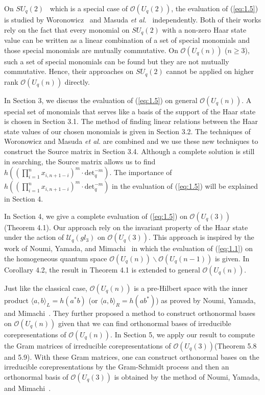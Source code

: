\documentclass[table,a4paper,reqno]{amsart}
\numberwithin{equation}{section}
\theoremstyle{definition}
\begin{document}
On $SU_q(2)$~\cite{sl1987twisted} which is a special case of $\mathcal{O}(U_q(2))$, the evaluation of (\ref{eq:1.5}) is studied by Woronowicz~\cite{sl1987twisted} and Masuda \textit{et al.}~\cite{masuda1991representations} independently. Both of their works rely on the fact that every monomial on $SU_q(2)$ with a non-zero Haar state value can be written as a linear combination of a set of special monomials and those special monomials are mutually commutative. On $\mathcal{O}(U_q(n))$ ($n\ge 3$), such a set of special monomials can be found but they are not mutually commutative. Hence, their approaches on $SU_q(2)$ cannot be applied on higher rank $\mathcal{O}(U_q(n))$ directly. 

In Section 3, we discuss the evaluation of (\ref{eq:1.5}) on general $\mathcal{O}(U_q(n))$. A special set of monomials that serves like a basis of the support of the Haar state is chosen in Section 3.1. The method of finding linear relations between the Haar state values of our chosen monomials is given in Section 3.2. The techniques of Woronowicz and Masuda \textit{et al.} are combined and we use these new techniques to construct the Source matrix in Section 3.4.  Although a complete solution is still in searching, the Source matrix allows us to find $h\left((\prod_{i=1}^nx_{i,n+1-i})^m\cdot \text{det}_q^{-m}\right)$. The importance of $h\left((\prod_{i=1}^nx_{i,n+1-i})^m\cdot \text{det}_q^{-m}\right)$ in the evaluation of (\ref{eq:1.5}) will be explained in Section 4. 

In Section 4, we give a complete evaluation of (\ref{eq:1.5}) on $\mathcal{O}(U_q(3))$ (Theorem 4.1). Our approach rely on the invariant property of the Haar state under the action of $\mathcal{U}_q(gl_3)$ on $\mathcal{O}(U_q(3))$. This approach is inspired by the work of Noumi, Yamada, and Mimachi~\cite{noumi1993finite} in which the evaluation of (\ref{eq:1.1}) on the homogeneous quantum space $\mathcal{O}(U_q(n))\backslash \mathcal{O}(U_q(n-1))$ is given. In Corollary 4.2, the result in Theorem 4.1 is extended to general $\mathcal{O}(U_q(n))$.

Just like the classical case, $\mathcal{O}(U_q(n))$ is a pre-Hilbert space with the inner product $\langle a,b\rangle_L=h(a^*b)$ (or $\langle a,b\rangle_R=h(ab^*)$) as proved by Noumi, Yamada, and Mimachi~\cite{noumi1993finite}. They further proposed a method to construct orthonormal bases on $\mathcal{O}(U_q(n))$ given that we can find orthonormal bases of irreducible corepresentations of $\mathcal{O}(U_q(n))$. In Section 5, we apply our result to compute the Gram matrices of irreducible corepresentations of $\mathcal{O}(U_q(3))$(Theorem 5.8 and 5.9). With these Gram matrices, one can construct orthonormal bases on the irreducible corepresentations by the Gram-Schmidt process and then an orthonormal basis of $\mathcal{O}(U_q(3))$ is obtained by the method of Noumi, Yamada, and Mimachi~\cite{noumi1993finite}.
\end{document}
